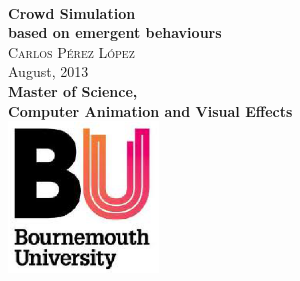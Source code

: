 
\begin{titlepage}

\begin{center}

~\\[4.0cm]
{ \huge \bfseries Crowd Simulation}\\[0.5cm]
{ \Large \bfseries based on emergent behaviours}\\[1.0cm]

{\large
\textsc{Carlos Pérez López}\\[1.5cm]


{\large August, 2013}\\[3.5cm]


\textbf{Master of Science,}\\[0.25cm]
\textbf{Computer Animation and Visual Effects}\\[1.0cm]

\includegraphics[width=0.3\textwidth]{img/bu_logo}\\[1cm]

}

\vfill

\end{center}

\end{titlepage}
